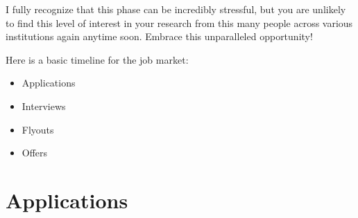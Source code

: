 \documentclass[12pt]{article}
\begin{document}
I fully recognize that this phase can be incredibly stressful, but you are unlikely to find this level of interest in your research from this many people across various institutions again anytime soon. Embrace this unparalleled opportunity!

Here is a basic timeline for the job market:
\begin{itemize}
\item Applications
\item Interviews
\item Flyouts
\item Offers
\end{itemize}

\section{Applications}
\label{sec:org17d0e70}
\end{document}
